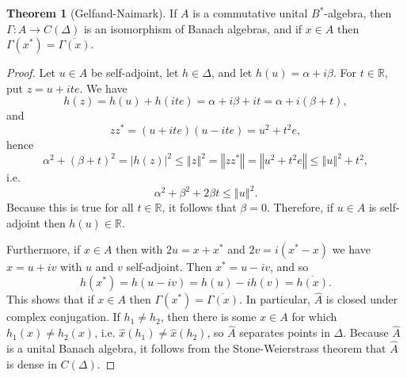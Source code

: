 \documentclass{article}
\newcommand{\norm}[1]{\left\Vert #1 \right\Vert}
\theoremstyle{definition}
\newtheorem{theorem}{Theorem}
\theoremstyle{definition}
\begin{document}
\begin{theorem}[Gelfand-Naimark]
If $A$ is a commutative unital $B^*$-algebra, then $\Gamma:A \to C(\Delta)$ is an isomorphism of Banach algebras, and if $x \in A$ then
$\Gamma(x^*)=\overline{\Gamma(x)}$.
\label{naimark}
\end{theorem}
\begin{proof}
Let $u \in A$ be self-adjoint, let $h \in \Delta$, and let $h(u)=\alpha + i\beta$. For $t \in \mathbb{R}$, put $z=u+ite$. 
We have
\[
h(z) = h(u)+h(ite) = \alpha+ i\beta + it = \alpha+i(\beta+t),
\]
and
\[
zz^*=(u+ite)(u-ite) = u^2+t^2 e,
\]
hence
\[
\alpha^2+(\beta+t)^2 = |h(z)|^2 \leq \norm{z}^2 = \norm{zz^*} =\norm{u^2+t^2e} \leq \norm{u}^2 + t^2,
\]
i.e.
\[
\alpha^2 + \beta^2 + 2 \beta t \leq \norm{u}^2.
\]
Because this is true for all $t \in \mathbb{R}$, it follows that $\beta=0$. Therefore, if $u \in A$ is self-adjoint then $h(u) \in \mathbb{R}$.

Furthermore, if $x \in A$ then with $2u=x+x^*$ and $2v=i(x^*-x)$ we have $x=u+iv$ with $u$ and $v$ self-adjoint. Then
$x^*=u-iv$, and so
\[
h(x^*)=h(u-iv)=h(u)-ih(v) = \overline{h(x)}.
\]
This shows that if $x \in A$ then $\Gamma(x^*)=\overline{\Gamma(x)}$.
In particular, $\widehat{A}$ is closed under complex conjugation. If $h_1 \neq h_2$, then there is some $x \in A$ for which
$h_1(x) \neq h_2(x)$, i.e. $\hat{x}(h_1) \neq \hat{x}(h_2)$, so $\widehat{A}$ separates points in $\Delta$. 
Because $\widehat{A}$ is a  unital Banach algebra, it follows from
the Stone-Weierstrass theorem that $\widehat{A}$ is dense in $C(\Delta)$. 


\end{proof}
\end{document}
